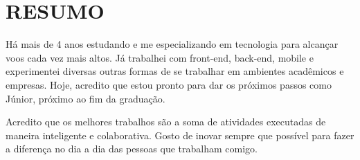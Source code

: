 

  \section{RESUMO}

  Há mais de 4 anos estudando e me especializando em tecnologia para alcançar voos cada vez mais altos. Já trabalhei com front-end, back-end, mobile e experimentei diversas outras formas de se trabalhar em ambientes acadêmicos e empresas. Hoje, acredito que estou pronto para dar os próximos passos como Júnior, próximo ao fim da graduação.

  Acredito que os melhores trabalhos são a soma de atividades executadas de maneira inteligente e colaborativa. Gosto de inovar sempre que possível para fazer a diferença no dia a dia das pessoas que trabalham comigo.

